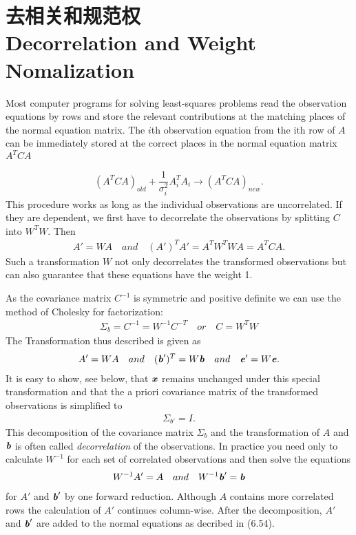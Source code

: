 \section[去相关和规范权]{去相关和规范权\\Decorrelation and Weight Nomalization}
\begin{flushleft}
	Most computer programs for solving least-squares problems read the observation equations by rows and store the relevant contributions at the matching places of the normal equation matrix. The $i$th observation equation from the ith row of $A$ can be immediately stored at the correct places in the normal equation matrix $A^{T}CA$
\end{flushleft}
\begin{align}
(A^{T}CA)_{old} + \dfrac{1}{\sigma^{2}_{i}}A^{T}_{i}A_{i}\rightarrow (A^{T}CA)_{new}.
\end{align}
This procedure works as long as the individual observations are uncorrelated. If they are dependent, we first have to decorrelate the observations by splitting $C$ into $W^{T}W$. Then
\begin{align}
A' = WA \quad and \quad (A')^{T}A' = A^{T}W^{T}WA = A^{T}CA.
\end{align}
Such a transformation $W$ not only decorrelates the transformed observations but can also guarantee that these equations have the weight 1.

As the covariance matrix $C^{-1}$ is symmetric and positive definite we can use the method of Cholesky for factorization:
\begin{align}
\Sigma _{b} = C^{-1} = W^{-1}C^{-T} \quad or \quad C = W^{T}W
\end{align}
 The Transformation thus described is given as
 \begin{align*}
 A' = WA \quad and \quad (\textbf{\textit{b}}')^{T} = W\textbf{\textit{b}} \quad and \quad  \textbf{\textit{e}}' = W\textbf{\textit{e}}.
 \end{align*}
 It is easy to show, see below, that $\textbf{\textit{x}}$ remains unchanged under this special transformation and that the a priori covariance matrix of the transformed observations is simplified to
 \begin{align}
 \Sigma_{b'} = I.
 \end{align}
 This decomposition of the covariance matrix $ \Sigma_{b}$ and the transformation of $A$ and $\textbf{\textit{b}}$ is often called \textit{decorrelation} of the observations. In practice you need only to calculate $ W^{-1}$ for each set of correlated observations and then solve the equations
 \begin{align}
 W^{-1}A' = A \quad and \quad  W^{-1}\textbf{\textit{b}}' =\textbf{\textit{b}}
 \end{align}
 for $A'$ and $\textbf{\textit{b}}'$ by one forward reduction. Although $A$ contains more correlated rows the calculation of $A'$ continues column-wise. After the decomposition, $A'$ and $\textbf{\textit{b}}'$ are added to the normal equations as decribed in (6.54).
 
